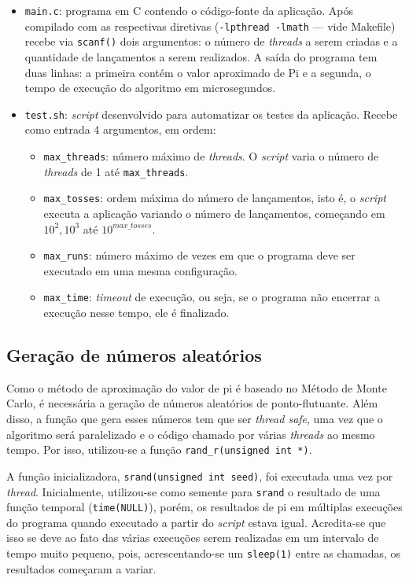 \documentclass[12pt,a4paper]{article}
\begin{document}
\begin{itemize}
	\item \texttt{main.c}: programa em C contendo o código-fonte da aplicação. Após compilado com as respectivas diretivas
		(\texttt{-lpthread -lmath} --- vide Makefile) recebe via
		\texttt{scanf()} dois argumentos: o número de \textit{threads} a serem
		criadas e a quantidade de lançamentos a serem realizados. A saída do
		programa tem duas linhas: a primeira contém o valor aproximado de Pi e
		a segunda, o tempo de execução do algoritmo em microsegundos.
	\item \texttt{test.sh}: \textit{script} desenvolvido para automatizar os
		testes da aplicação. Recebe como entrada 4 argumentos, em ordem:
		\begin{itemize}
			\item \texttt{max\_threads}: número máximo de \textit{threads}. O
				\textit{script} varia o número de \textit{threads} de 1 até
				\texttt{max\_threads}.
			\item \texttt{max\_tosses}: ordem máxima do número de lançamentos, isto
				é, o \textit{script} executa a aplicação variando o 
				número de lançamentos, começando em $10^2, 10^3$ até $10^{max\_tosses}$.
			\item \texttt{max\_runs}: número máximo de vezes em que o programa
				deve ser executado em uma mesma configuração.
			\item \texttt{max\_time}: \textit{timeout} de execução, ou seja, se o
				programa não encerrar a execução nesse tempo, ele é finalizado.
		\end{itemize}
\end{itemize}

\subsection{Geração de números aleatórios}
Como o método de aproximação do valor de pi é baseado no Método de Monte Carlo,
é necessária a geração de números aleatórios de ponto-flutuante. Além disso, a
função que gera esses números tem que ser \textit{thread safe}, uma vez que o
algoritmo será paralelizado e o código chamado por várias \textit{threads} ao
mesmo tempo. Por isso, utilizou-se a função \texttt{rand\_r(unsigned int *)}.

A função inicializadora, \texttt{srand(unsigned int seed)}, foi executada uma
vez por \textit{thread}. Inicialmente, utilizou-se como semente para
\texttt{srand} o resultado de uma função temporal (\texttt{time(NULL)}), porém,
os resultados de pi em múltiplas execuções do programa quando executado a
partir do \textit{script} estava igual. Acredita-se que isso se deve ao fato
das várias execuções serem realizadas em um intervalo de tempo muito pequeno,
pois, acrescentando-se um \texttt{sleep(1)} entre as chamadas, os resultados
começaram a variar.
\end{document}
